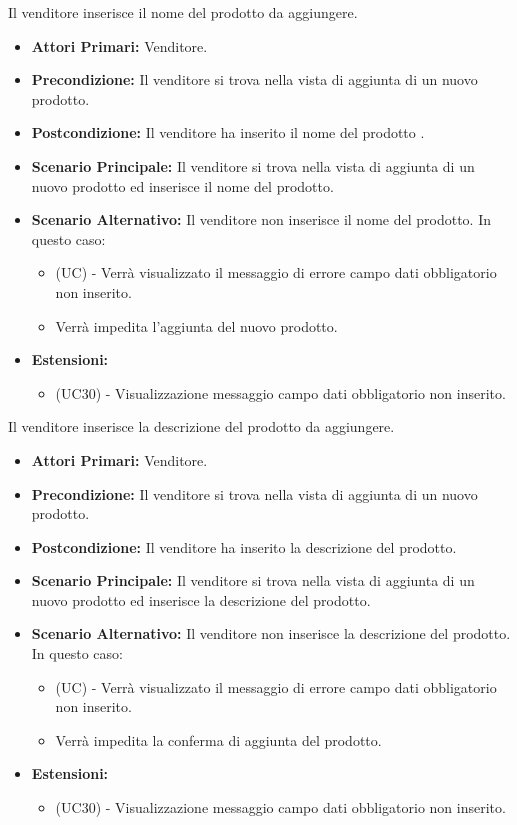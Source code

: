\resetSubUC

Il venditore inserisce il nome del prodotto da aggiungere.
\begin{itemize}
    \item \textbf{Attori Primari:} Venditore.
    \item \textbf{Precondizione:} Il venditore si trova nella vista di aggiunta di un nuovo prodotto.
    \item \textbf{Postcondizione:} Il venditore ha inserito il nome del prodotto .
    \item \textbf{Scenario Principale:} Il venditore si trova nella vista di aggiunta di un nuovo prodotto ed inserisce il nome del prodotto.
    \item \textbf{Scenario Alternativo:} Il venditore non inserisce il nome del prodotto. In questo caso:
    \begin{itemize}
        \item (UC) - Verrà visualizzato il messaggio di errore campo dati obbligatorio non inserito.
        \item Verrà impedita l'aggiunta del nuovo prodotto.
    \end{itemize}
    \item \textbf{Estensioni:}
    \begin{itemize}
        \item (UC30) - Visualizzazione messaggio campo dati obbligatorio non inserito.
    \end{itemize}
\end{itemize}

Il venditore inserisce la descrizione del prodotto da aggiungere.
\begin{itemize}
    \item \textbf{Attori Primari:} Venditore.
    \item \textbf{Precondizione:} Il venditore si trova nella vista di aggiunta di un nuovo prodotto.
    \item \textbf{Postcondizione:} Il venditore ha inserito la descrizione del prodotto.
    \item \textbf{Scenario Principale:} Il venditore si trova nella vista di aggiunta di un nuovo prodotto ed inserisce la descrizione del prodotto.
    \item \textbf{Scenario Alternativo:} Il venditore non inserisce la descrizione del prodotto. In questo caso:
    \begin{itemize}
        \item (UC) - Verrà visualizzato il messaggio di errore campo dati obbligatorio non inserito.
        \item Verrà impedita la conferma di aggiunta del prodotto.
    \end{itemize}
    \item \textbf{Estensioni:}
    \begin{itemize}
        \item (UC30) - Visualizzazione messaggio campo dati obbligatorio non inserito.
    \end{itemize}
\end{itemize}

